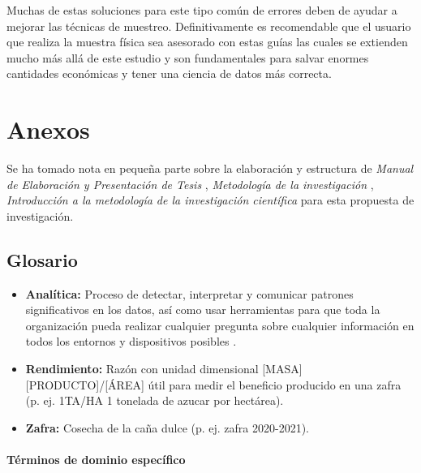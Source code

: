 \documentclass{report}
\begin{document}
Muchas de estas soluciones para este tipo común de errores deben de ayudar a mejorar las técnicas de muestreo. Definitivamente es recomendable que el usuario que realiza la muestra física sea asesorado con estas guías las cuales se extienden mucho más allá de este estudio y son fundamentales para salvar enormes cantidades económicas y tener una ciencia de datos más correcta.



\chapter{Anexos}

Se ha tomado nota en pequeña parte sobre la elaboración y estructura de \textit{Manual de Elaboración y Presentación de Tesis} \cite{universidad-san-carlos-2016}, \textit{Metodología de la investigación} \cite{collado-2014}, \textit{Introducción a la metodología de la investigación científica} \cite{cabezas-2018} para esta propuesta de investigación.

\section{Glosario}

\begin{itemize}
    \item \textbf{Analítica:} Proceso de detectar, interpretar y comunicar patrones significativos en los datos, así como usar herramientas para que toda la organización pueda realizar cualquier pregunta sobre cualquier información en todos los entornos y dispositivos posibles \cite{oracle-2021}.
    
    \item \textbf{Rendimiento:} Razón con unidad dimensional [MASA][PRODUCTO]/[ÁREA] útil para medir el beneficio producido en una zafra (p. ej. 1TA/HA 1 tonelada de azucar por hectárea).
    
    \item \textbf{Zafra:} Cosecha de la caña dulce (p. ej. zafra 2020-2021).
\end{itemize}

\subsubsection{Términos de dominio específico}
\end{document}
